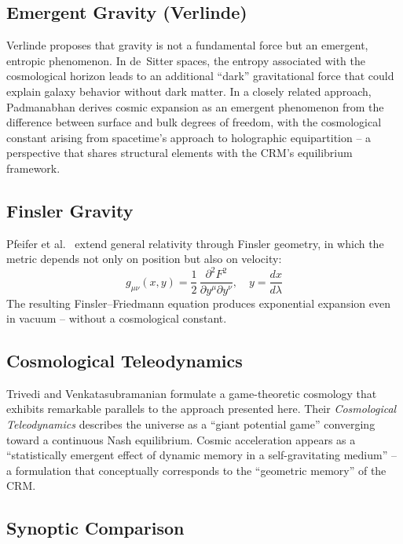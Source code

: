 \documentclass[aps,prd,twocolumn,superscriptaddress,nofootinbib]{revtex4-2}
\begin{document}
\subsection{Emergent Gravity (Verlinde)}

Verlinde \cite{Verlinde2011, Verlinde2017} proposes that gravity is not a fundamental force but an emergent, entropic phenomenon. In de~Sitter spaces, the entropy associated with the cosmological horizon leads to an additional ``dark'' gravitational force that could explain galaxy behavior without dark matter. In a closely related approach, Padmanabhan \cite{Padmanabhan2012} derives cosmic expansion as an emergent phenomenon from the difference between surface and bulk degrees of freedom, with the cosmological constant arising from spacetime's approach to holographic equipartition -- a perspective that shares structural elements with the CRM's equilibrium framework.

\subsection{Finsler Gravity}

Pfeifer et al.\ \cite{Pfeifer2025} extend general relativity through Finsler geometry, in which the metric depends not only on position but also on velocity:
\begin{equation}
g_{\mu\nu}(x, y) = \frac{1}{2}\,\frac{\partial^2 F^2}{\partial y^\mu \partial y^\nu}, \quad y = \frac{dx}{d\lambda}
\end{equation}
The resulting Finsler--Friedmann equation produces exponential expansion even in vacuum -- without a cosmological constant.


\subsection{Cosmological Teleodynamics}

Trivedi and Venkatasubramanian \cite{Trivedi2025} formulate a game-theoretic cosmology that exhibits remarkable parallels to the approach presented here. Their \textit{Cosmological Teleodynamics} describes the universe as a ``giant potential game'' converging toward a continuous Nash equilibrium. Cosmic acceleration appears as a ``statistically emergent effect of dynamic memory in a self-gravitating medium'' -- a formulation that conceptually corresponds to the ``geometric memory'' of the CRM.


\subsection{Synoptic Comparison}
\label{subsec:synopse}
\end{document}
